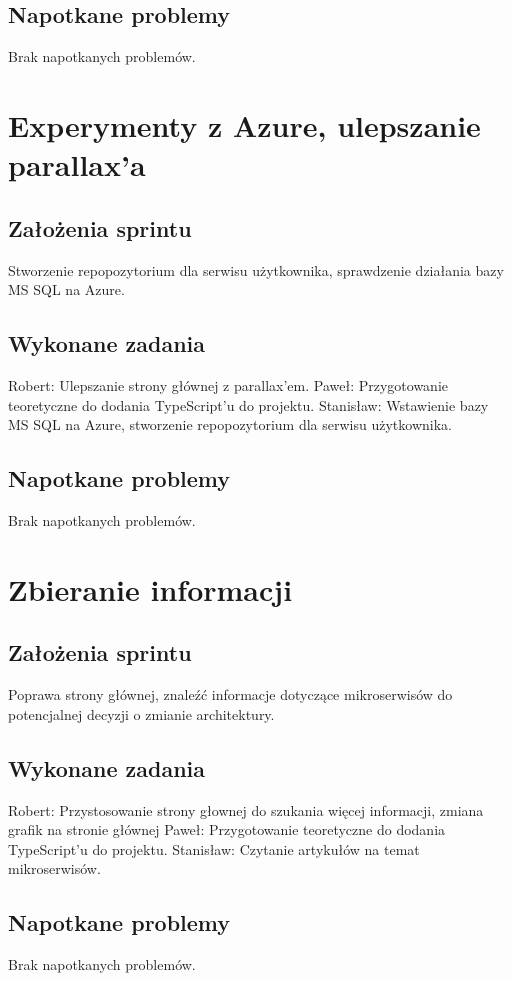 \documentclass[a4paper,11pt]{report}
\begin{document}
\subsection {Napotkane problemy}
Brak napotkanych problemów.

\section {Experymenty z Azure, ulepszanie parallax'a}
\subsection {Założenia sprintu}
Stworzenie repopozytorium dla serwisu użytkownika, sprawdzenie działania bazy MS SQL na Azure.
\subsection {Wykonane zadania}
Robert: Ulepszanie strony głównej z parallax'em.
Paweł: Przygotowanie teoretyczne do dodania TypeScript'u do projektu.
Stanisław: Wstawienie bazy MS SQL na Azure, stworzenie repopozytorium dla serwisu użytkownika.  
\subsection {Napotkane problemy}
Brak napotkanych problemów.

\section {Zbieranie informacji}
\subsection {Założenia sprintu}
Poprawa strony głównej, znaleźć informacje dotyczące mikroserwisów do potencjalnej decyzji o zmianie architektury.
\subsection {Wykonane zadania}
Robert: Przystosowanie strony głownej do szukania więcej informacji, zmiana grafik na stronie głównej 
Paweł: Przygotowanie teoretyczne do dodania TypeScript'u do projektu. 
Stanisław: Czytanie artykułów na temat mikroserwisów.
\subsection {Napotkane problemy}
Brak napotkanych problemów.
\end{document}
